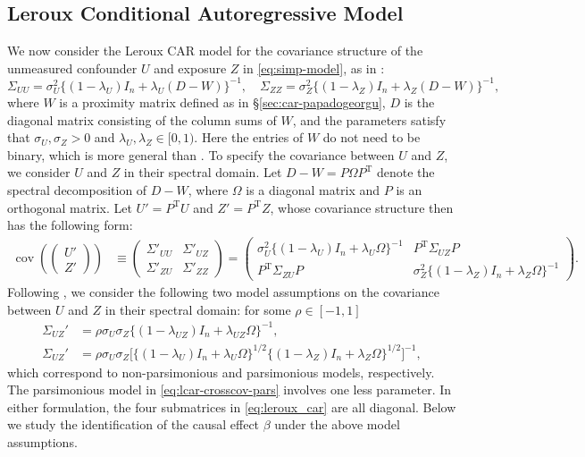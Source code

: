 \documentclass[11pt]{article}
\theoremstyle{definition}
\theoremstyle{remark}
\DeclareMathOperator{\cov}{cov}
\def\top{{ \mathrm{\scriptscriptstyle T} }}
\begin{document}
\subsection{Leroux Conditional Autoregressive Model}\label{sec:leroux_car}
We now consider the Leroux CAR model \citep{leroux2000estimation} for the covariance structure of the unmeasured confounder $U$ and exposure $Z$ in \eqref{eq:simp-model}, as in \citet{guan2023spectral}: 
\begin{equation}\label{eq:lcar-var}
\Sigma_{UU} = \sigma_U^2\{ (1-\lambda_U)I_n + \lambda_U (D-W) \}^{-1}, \quad  \Sigma_{ZZ} = \sigma_Z^2 \{ (1-\lambda_Z)I_n + \lambda_Z (D-W) \}^{-1},
\end{equation} 
where $W$ is a proximity matrix defined as in \S \ref{sec:car-papadogeorgu}, $D$ is the diagonal matrix consisting of the column sums of $W$, and the parameters satisfy that $\sigma_U, \sigma_Z > 0$ and $\lambda_U, \lambda_Z \in [0,1)$.
Here the entries of $W$ do not need to be binary, which is more general than \citet{guan2023spectral}. 
To specify the covariance between $U$ and $Z$, we consider $U$ and $Z$ in their spectral domain. Let $D-W = P \Omega P^\top$ denote the spectral decomposition of $D-W$, where $\Omega$ is a diagonal matrix and $P$ is an orthogonal matrix.
Let $U' = P^\top U$ and $Z' = P^\top Z$, whose covariance structure then has the following form: 
\begin{align}\label{eq:leroux_car}
    \cov\left( \begin{pmatrix}U' \\ Z' \end{pmatrix} \right)
    & \equiv 
    \begin{pmatrix} \Sigma'_{UU} & \Sigma'_{UZ} \\ \Sigma'_{ZU} & \Sigma'_{ZZ} \end{pmatrix}
    = 
    \begin{pmatrix} 
    \sigma^2_U \{(1-\lambda_U)I_n+\lambda_U \Omega\}^{-1} & P^\top \Sigma_{UZ} P 
    \\ 
    P^\top \Sigma_{ZU} P & \sigma^2_Z \{(1-\lambda_Z)I_n+\lambda_Z \Omega\}^{-1}
    \end{pmatrix}. 
\end{align}
Following \citet{guan2023spectral}, we consider the following two model assumptions on the covariance between $U$ and $Z$ in their spectral domain: for some $\rho \in [-1, 1]$
\begin{align}\label{eq:lcar-crosscov-flex}
\Sigma_{UZ}' & = \rho \sigma_U\sigma_Z \{(1-\lambda_{UZ})I_n + \lambda_{UZ}\Omega\}^{-1}, 
\\
\label{eq:lcar-crosscov-pars} 
\Sigma_{UZ}' & = \rho\sigma_U\sigma_Z \big[\{(1-\lambda_U)I_n + \lambda_U\Omega\}^{1/2}\{(1-\lambda_Z)I_n+\lambda_Z \Omega\}^{1/2}\big]^{-1},
\end{align}
which correspond to non-parsimonious and parsimonious models, respectively. The parsimonious model in \eqref{eq:lcar-crosscov-pars} involves one less parameter. In either formulation,  the four submatrices in \eqref{eq:leroux_car} are all diagonal.
Below we study the identification of the causal effect $\beta$ under the above model assumptions. 
\end{document}
